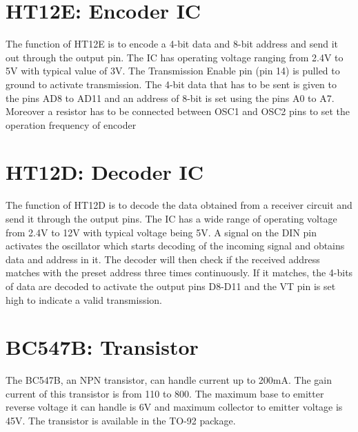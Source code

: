 \section{HT12E: Encoder IC}


The function of HT12E is to encode a 4-bit data and 8-bit address and
send it out through the output pin. The IC has operating voltage
ranging from 2.4V to 5V with typical value of 3V. The Transmission
Enable pin (pin 14) is pulled to ground to activate transmission. The
4-bit data that has to be sent is given to the pins AD8 to AD11 and
an address of 8-bit is set using the pins A0 to A7.  Moreover a
resistor has to be connected between OSC1 and OSC2 pins to set the
operation frequency of encoder

\vspace*{1.5cm}

\section{HT12D: Decoder IC}


The function of HT12D is to decode the data obtained from a receiver
circuit and send it through the output pins. The IC has a wide range
of operating voltage from 2.4V to 12V with typical voltage being 5V.
A signal on the DIN pin activates the oscillator which starts
decoding of the incoming signal and obtains data and address in it.
The decoder will then check if the received address matches with the
preset address three times continuously. If it matches, the 4-bits of
data are decoded to activate the output pins D8-D11 and the VT pin is
set high to indicate a valid transmission.

\section{BC547B: Transistor}


The BC547B, an NPN transistor, can handle current up to 200mA. The
gain current of this transistor is from 110 to 800. The maximum base
to emitter reverse voltage it can handle is 6V and maximum collector
to emitter voltage is 45V. The transistor is available in the TO-92 package.

\vspace*{1cm}

